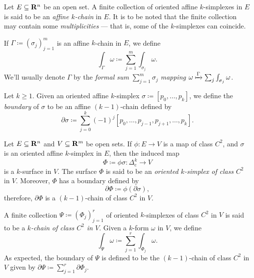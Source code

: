 \begin{definition}
\label{def:affine-k-chain}
Let \(E \subseteq \mathbf{R}^n\) be an open set. A finite collection of oriented affine
\(k\)-simplexes in \(E\) is said to be an \emph{affine \(k\)-chain} in \(E\). It
is to be noted that the finite collection may contain some \emph{multiplicities}
--- that is, some of the \(k\)-simplexes can coincide.

If \(\Gamma \coloneq (\sigma_j)_{j=1}^m\) is an affine \(k\)-chain in \(E\), we
define
\[
  \int_{\Gamma} \omega \coloneq \sum_{j=1}^m \int_{\sigma_j} \omega.
\]
We'll usually denote \(\Gamma\) by the \emph{formal sum} \(\sum_{j=1}^m \sigma_j\)
\emph{mapping} \(\omega \xmapsto{\Gamma} \sum_j \int_{\sigma_j} \omega\).
\end{definition}

\begin{definition}[Boundary]
\label{def:affine-k-simplex-boundary}
Let \(k \geq 1\). Given an oriented affine \(k\)-simplex \(\sigma \coloneq [p_0,
\dots, p_k]\), we define the \emph{boundary} of \(\sigma\) to be an affine
\((k-1)\)-chain defined by
\[
  \partial \sigma \coloneq
  \sum_{j=0}^k (-1)^j [p_0, \dots, p_{j-1}, p_{j+1}, \dots, p_k].
\]
\end{definition}

\begin{definition}
\label{def:differentiable-simplexes-and-chains}
Let \(E \subseteq \mathbf{R}^n\) and \(V \subseteq \mathbf{R}^m\) be open sets. If \(\phi: E \to
V\) is a map of class \(C^2\), and \(\sigma\) is an oriented affine
\(k\)-simplex in \(E\), then the induced map
\[
  \Phi \coloneq \phi \sigma: \Delta_{\text{c}}^k \longrightarrow V
\]
is a \(k\)-surface in \(V\). The surface \(\Phi\) is said to be an
\emph{oriented \(k\)-simplex of class \(C^2\)} in \(V\). Moreover, \(\Phi\) has
a boundary defined by
\[
  \partial \Phi \coloneq \phi(\partial \sigma),
\]
therefore, \(\partial \Phi\) is a \((k-1)\)-chain of class \(C^2\) in \(V\).

A finite collection \(\Psi \coloneq (\Phi_j)_{j=1}^r\) of oriented
\(k\)-simplexes of class \(C^2\) in \(V\) is said to be a \emph{\(k\)-chain of
class \(C^2\) in \(V\)}. Given a \(k\)-form \(\omega\) in \(V\), we define
\[
  \int_{\Psi} \omega \coloneq \sum_{j=1}^r \int_{\Phi_j} \omega.
\]
As expected, the boundary of \(\Psi\) is defined to be the \((k-1)\)-chain of
class \(C^2\) in \(V\) given by \(\partial \Psi \coloneq \sum_{j=1}^r \partial
\Phi_j\).
\end{definition}


